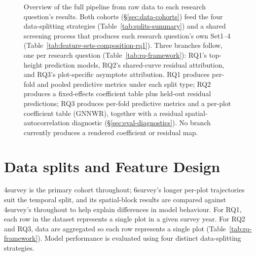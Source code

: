 \begin{figure}[!htbp]
\centering
{}
\caption{Overview of the full pipeline from raw data to each research question's results. Both
cohorts (\S\ref{sec:data-cohorts}) feed the four data-splitting strategies
(Table~\ref{tab:splits-summary}) and a shared screening process that produces each research
question's own Set1--4 (Table~\ref{tab:feature-sets-composition-rq1}). Three branches follow, one
per research question (Table~\ref{tab:rq-framework}): RQ1's top-height prediction models, RQ2's
shared-curve residual attribution, and RQ3's plot-specific asymptote attribution. RQ1 produces
per-fold and pooled predictive metrics under each split type; RQ2 produces a fixed-effects
coefficient table plus held-out residual predictions; RQ3 produces per-fold predictive metrics and
a per-plot coefficient table (GNNWR), together with a residual spatial-autocorrelation diagnostic
(\S\ref{sec:eval-diagnostics}). No branch currently produces a rendered coefficient or residual
map.}
\label{fig:pipeline-overview}
\end{figure}



\section{Data splits and Feature Design} 
4survey is the primary cohort throughout; 6survey's longer per-plot trajectories suit the temporal split, and its spatial-block results are compared against 4survey's throughout to help explain differences in model behaviour. For RQ1, each row in the dataset represents a single plot in a given survey year. For RQ2 and RQ3, data are aggregated so each row represents a single plot (Table~\ref{tab:rq-framework}). Model performance is evaluated using four distinct data-splitting strategies.

